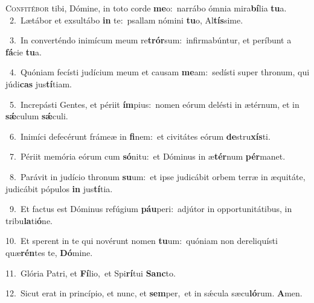 \lettrine{\initial\textcolor{\initialcolor}{C}}{onfitébor} tibi, Dómine, in toto corde \textbf{me}\-o:~\star narrábo ómnia mira\-\textbf{bí}\-lia \textbf{tu}\-a.\\
{\numbfont\textcolor{\numbcolor}{~2.}}~Lætábor et exsultábo \textbf{in} te:~\star psallam nómini \textbf{tu}\-o, Al\-\textbf{tís}\-sime.\par
{\numbfont\textcolor{\numbcolor}{~3.}}~In converténdo inimícum meum re\-\textbf{trór}\-sum:~\star infirmabúntur, et períbunt a \textbf{fá}\-cie \textbf{tu}\-a.\par
{\numbfont\textcolor{\numbcolor}{~4.}}~Quóniam fecísti judícium meum et causam \textbf{me}\-am:~\star sedísti super thronum, qui júdi\textbf{cas} jus\-\textbf{tí}\-tiam.\par
{\numbfont\textcolor{\numbcolor}{~5.}}~Increpásti Gentes, et périit \textbf{ím}\-pius:~\star nomen eórum delésti in ætérnum, et in \textbf{sǽ}\-culum \textbf{sǽ}\-culi.\par
{\numbfont\textcolor{\numbcolor}{~6.}}~Inimíci defecérunt frámeæ in \textbf{fi}\-nem:~\star et civitátes eórum \textbf{de}\-stru\-\textbf{xís}\-ti.\par
{\numbfont\textcolor{\numbcolor}{~7.}}~Périit memória eórum cum \textbf{só}\-nitu:~\star et Dóminus in æ\-\textbf{tér}\-num \textbf{pér}\-manet.\par
{\numbfont\textcolor{\numbcolor}{~8.}}~Parávit in judício thronum \textbf{su}\-um:~\star et ipse judicábit orbem terræ in æquitáte, judicábit pópulos \textbf{in} jus\-\textbf{tí}\-tia.\par
{\numbfont\textcolor{\numbcolor}{~9.}}~Et factus est Dóminus refúgium \textbf{páu}\-peri:~\star adjútor in opportunitátibus, in tribu\-\textbf{la}\-ti\-\textbf{ó}\-ne.\par
{\numbfont\textcolor{\numbcolor}{10.}}~Et sperent in te qui novérunt nomen \textbf{tu}\-um:~\star quóniam non dereliquísti quæ\-\textbf{rén}\-tes te, \textbf{Dó}\-mine.\par
{\numbfont\textcolor{\numbcolor}{11.}}~Glória Patri, et \textbf{Fí}\-lio,~\star et Spi\-\textbf{rí}\-tui \textbf{Sanc}\-to.\par
{\numbfont\textcolor{\numbcolor}{12.}}~Sicut erat in princípio, et nunc, et \textbf{sem}\-per,~\star et in sǽcula sæcu\-\textbf{ló}\-rum. \textbf{A}\-men.\par
